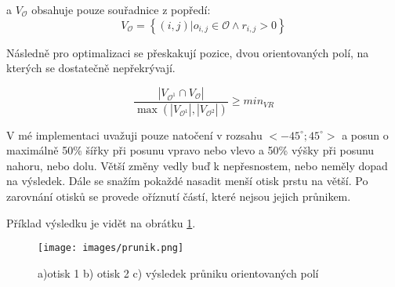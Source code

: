 \documentclass[a4paper,11pt]{article}
\begin{document}
\begin{multicols*}{2}
    a $V_{\mathcal{O}}$ obsahuje pouze souřadnice z popředí:
    \begin{equation}
        V_{\mathcal{O}}=\left\{(i, j) | o_{i, j} \in \mathcal{O} \wedge r_{i, j}>0\right\}
    \end{equation}
    
    Následně pro optimalizaci se přeskakují pozice, dvou orientovaných polí, na kterých se dostatečně nepřekrývají.
    
    \begin{equation}
        \frac{\left|V_{\mathcal{O}^{1}} \cap V_{\mathcal{O}}\right|}{\max \left(\left|V_{\mathcal{O}^{1} }\right|, | V_{\mathcal{O}^{2} }|\right)} \geq min_{V R}
    \end{equation}
    
    V mé implementaci uvažuji pouze natočení v rozsahu $<-45^{\circ};45^{\circ}>$ a posun o maximálně 50\% šířky při posunu vpravo nebo vlevo a 50\% výšky při posunu nahoru, nebo dolu. Větší změny vedly buď k nepřesnostem, nebo neměly dopad na výsledek. Dále se snažím pokaždé nasadit menší otisk prstu na větší. Po zarovnání otisků se provede oříznutí částí, které nejsou jejich průnikem.
    
    Příklad výsledku je vidět na obrátku \ref{fig:prunik}.
    \begin{figure}[H]
        \centering
            {\texttt{[image: images/prunik.png]}}\\
            \caption{a)otisk 1 b) otisk 2 c) výsledek průniku orientovaných polí}
            \label{fig:prunik}
    \end{figure}

\end{multicols*}
\end{document}

